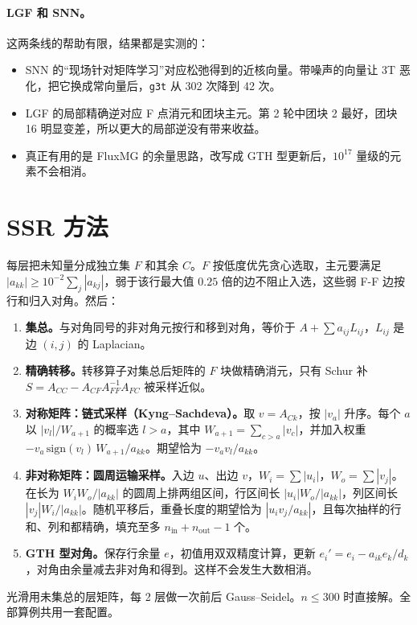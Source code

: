 \documentclass[11pt,a4paper]{ctexart}
\begin{document}
\paragraph{LGF 和 SNN。}这两条线的帮助有限，结果都是实测的：
\begin{itemize}
\item SNN 的“现场针对矩阵学习”对应松弛得到的近核向量。带噪声的向量让 3T 恶化，把它换成常向量后，\texttt{g3t} 从 302 次降到 42 次。
\item LGF 的局部精确逆对应 F 点消元和团块主元。第 2 轮中团块 2 最好，团块 16 明显变差，所以更大的局部逆没有带来收益。
\item 真正有用的是 FluxMG 的余量思路，改写成 GTH 型更新后，$10^{17}$ 量级的元素不会相消。
\end{itemize}

\section{SSR 方法}
每层把未知量分成独立集 $F$ 和其余 $C$。$F$ 按低度优先贪心选取，主元要满足 $|a_{kk}|\ge 10^{-2}\sum_j|a_{kj}|$，弱于该行最大值 $0.25$ 倍的边不阻止入选，这些弱 F-F 边按行和归入对角。然后：
\begin{enumerate}
\item \textbf{集总。}与对角同号的非对角元按行和移到对角，等价于 $A+\sum a_{ij}L_{ij}$，$L_{ij}$ 是边 $(i,j)$ 的 Laplacian。
\item \textbf{精确转移。}转移算子对集总后矩阵的 $F$ 块做精确消元，只有 Schur 补 $S=A_{CC}-A_{CF}A_{FF}^{-1}A_{FC}$ 被采样近似。
\item \textbf{对称矩阵：链式采样（Kyng--Sachdeva）。}取 $v=A_{Ck}$，按 $|v_a|$ 升序。每个 $a$ 以 $|v_l|/W_{a+1}$ 的概率选 $l>a$，其中 $W_{a+1}=\sum_{c>a}|v_c|$，并加入权重 $-v_a\,\mathrm{sign}(v_l)\,W_{a+1}/a_{kk}$。期望恰为 $-v_av_l/a_{kk}$。
\item \textbf{非对称矩阵：圆周运输采样。}入边 $u$、出边 $v$，$W_i=\sum|u_i|$，$W_o=\sum|v_j|$。在长为 $W_iW_o/|a_{kk}|$ 的圆周上排两组区间，行区间长 $|u_i|W_o/|a_{kk}|$，列区间长 $|v_j|W_i/|a_{kk}|$。随机平移后，重叠长度的期望恰为 $|u_iv_j/a_{kk}|$，且每次抽样的行和、列和都精确，填充至多 $n_\text{in}+n_\text{out}-1$ 个。
\item \textbf{GTH 型对角。}保存行余量 $e$，初值用双双精度计算，更新 $e_i'=e_i-a_{ik}e_k/d_k$，对角由余量减去非对角和得到。这样不会发生大数相消。
\end{enumerate}
光滑用未集总的层矩阵，每 2 层做一次前后 Gauss--Seidel。$n\le300$ 时直接解。全部算例共用一套配置。
\end{document}
